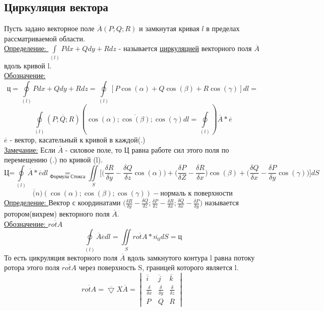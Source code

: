 \documentclass[12pt]{article}
\let\oldint\int
\let\oldiint\iint
\let\oldoint\oint
\renewcommand{\int}{\oldint\limits}
\renewcommand{\oint}{\oldoint\limits}
\renewcommand{\iint}{\oldiint\limits}
\begin{document}
  \subsection{Циркуляция вектора}
  Пусть задано векторное поле $\overline{A}(P;Q;R)$ и замкнутая кривая $l$ в пределах рассматриваемой
  области.\\
  \underline{Определение: }$\int_{(l)} Pdx+Qdy+Rdz$ - называется \underline{циркуляцией} векторного поля
  $\overline{A}$ вдоль кривой l.\\
  \underline{Обозначение:} 
  \[\text{ц} = \oint_{(l)} Pdx+Qdy+Rdz= \oint_{(l)}[P\cos(\alpha)+Q\cos(\beta)+R\cos(\gamma)]dl=\]
  \[\oint_{(l)}(\overline{P;Q;R})(\overline{\cos(\alpha);\cos(\beta);\cos(\gamma)}dl=
  \oint_{(l)})\overline{A}*\overline{e}\]
  $\overline{e}$ - вектор, касательный к кривой в каждой(.)\\
  \underline{Замечание:} Если $\overline{A}$ - силовое поле, то Ц равна работе сил этого поля по
  перемещению (.) по кривой (l).
  \[\text{Ц=} \oint_{(l)} \overline{A}*\overline{e}dl \underset{\text{Формула Стокса}}{=}
  \iint_S \Big[\Big(\frac{\delta R}{\delta y}-\frac{\delta Q}{\delta z}\cos(\alpha)\Big)
  + \Big(\frac{\delta P}{\delta Z} - \frac{\delta R}{\delta x}\Big)\cos(\beta)
  + \Big(\frac{\delta Q}{\delta x}-\frac{\delta P}{\delta y}\cos(\gamma)\Big)\Big]dS\]
  \[\overline(n)(\cos(\alpha);\cos(\beta);\cos(\gamma)) - \text{нормаль к поверхности}\]
  \underline{Определение: } Вектор с координатами $\Big(\frac{\delta R}{\delta y}-\frac{\delta Q}{\delta z};
  \frac{\delta P}{\delta z}-\frac{\delta R}{\delta x};\frac{\delta Q}{\delta x} - \frac{\delta P}{\delta y}\Big)$
  называется ротором(вихрем) векторного поля $\overline{A}$.\\
  \underline{Обозначение: } $\overline{rotA}$
  \[\oint_{(l)}\overline{A}\overline{e}dl = \iint_S \overline{rotA}*\overline{n_0}dS = \text{ц}\]
  То есть цикруляция векторного поля $\overline{A}$ вдоль замкнутого контура l равна потоку ротора этого поля
  $\overline{rotA}$ через поверхность S, границей которого является l.
  \[\overline{rotA} = \overline{\bigtriangledown} X \overline{A} = 
  \begin{vmatrix}
    \overline{i} & \overline{j} &\overline{k}\\
    \frac{\delta}{\delta x} & \frac{\delta }{\delta y} & \frac{\delta }{\delta z}\\
    P & Q & R
  \end{vmatrix}\]
\end{document}
